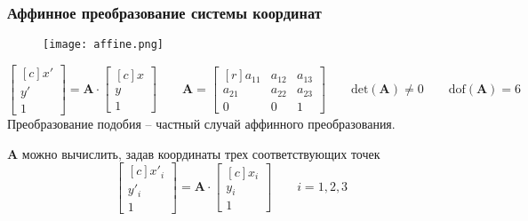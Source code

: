 \documentclass[
    12pt, 
    usepdftitle=false,
    aspectratio=1610
]{beamer}
\begin{document}
\begin{frame}
    \frametitle{Аффинное преобразование системы координат}
    \begin{figure}[t]
        \texttt{[image: affine.png]}
    \end{figure}
    $$
        \begin{bmatrix*}[c]
            x' \\ y' \\ 1    
        \end{bmatrix*}=
        \mathbf{A}\cdot
        \begin{bmatrix*}[c]
            x \\ y \\ 1    
        \end{bmatrix*}
        \qquad
        \mathbf{A}=
        \begin{bmatrix*}[r]
            a_{11} & a_{12} & a_{13} \\
            a_{21} & a_{22} & a_{23} \\
            0 & 0 & 1
        \end{bmatrix*}
        \qquad
        \mathrm{det}(\mathbf{A})\ne0
        \qquad
        \mathrm{dof}(\mathbf{A})=6
    $$
    Преобразование подобия -- частный случай аффинного преобразования.

    $\mathbf{A}$ можно вычислить, задав координаты трех соответствующих точек 
    $$
        \begin{bmatrix*}[c]
            x'_i \\ y'_i \\ 1    
        \end{bmatrix*}=
        \mathbf{A}\cdot
        \begin{bmatrix*}[c]
            x_i \\ y_i \\ 1    
        \end{bmatrix*}
        \qquad
        i=1,2,3
    $$
\end{frame}
\end{document}
